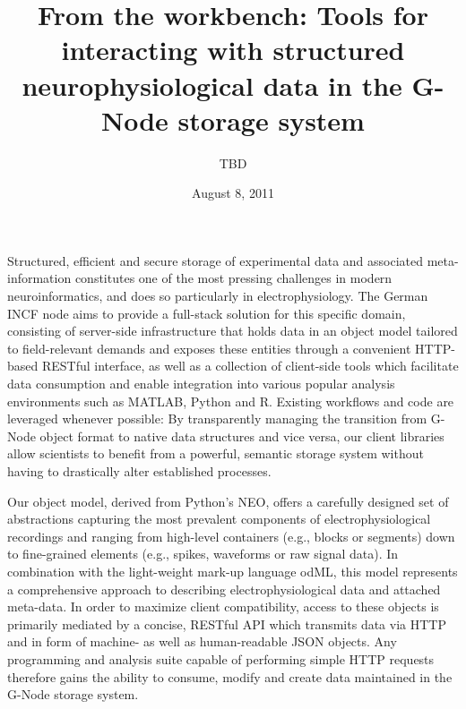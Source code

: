 \documentclass[a4paper]{article}
\begin{document}
\title{From the workbench: Tools for interacting with structured
  neurophysiological data in the G-Node storage system}

\author{TBD}
\date{August 8, 2011}

\maketitle


Structured, efficient and secure storage of experimental data and
associated meta-information constitutes one of the most pressing
challenges in modern neuroinformatics, and does so particularly in
electrophysiology. The German INCF node aims to provide a full-stack
solution for this specific domain, consisting of server-side
infrastructure that holds data in an object model tailored to
field-relevant demands and exposes these entities through a convenient
HTTP-based RESTful interface, as well as a collection of client-side
tools which facilitate data consumption and enable integration into
various popular analysis environments such as MATLAB, Python and
R. Existing workflows and code are leveraged whenever possible: By
transparently managing the transition from G-Node object format to
native data structures and vice versa, our client libraries allow
scientists to benefit from a powerful, semantic storage system without
having to drastically alter established processes.

Our object model, derived from Python's NEO, offers a carefully
designed set of abstractions capturing the most prevalent components
of electrophysiological recordings and ranging from high-level
containers (e.g., blocks or segments) down to fine-grained elements
(e.g., spikes, waveforms or raw signal data). In combination with the
light-weight mark-up language odML, this model represents a
comprehensive approach to describing electrophysiological data and
attached meta-data. In order to maximize client compatibility, access
to these objects is primarily mediated by a concise, RESTful API which
transmits data via HTTP and in form of machine- as well as
human-readable JSON objects. Any programming and analysis suite
capable of performing simple HTTP requests therefore gains the ability
to consume, modify and create data maintained in the G-Node storage
system.
\end{document}
